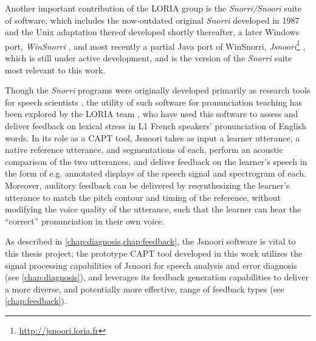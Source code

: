 	Another important contribution of the LORIA group is 
	the \textit{Snorri/Snoori} suite of software, 
	which includes the now-outdated original \textit{Snorri} developed in 1987 \citep{Fohr1989} and the Unix adaptation thereof developed shortly thereafter,
	a later Windows port, \textit{WinSnorri} \citep{Laprie1999},
	and most recently a partial Java port of WinSnorri, \textit{Jsnoori}\footnote{\url{http://jsnoori.loria.fr}} \citep{Parole2013}, which is still under active development, and is the version of the \textit{Snorri} suite most relevant to this work.
	
	
	Though the \textit{Snorri} programs were originally developed primarily as research tools for speech scientists %
	\citep{Fohr1989,Laprie1999}, 
	the utility of such software
	for pronunciation teaching has been explored by the LORIA team \citep{Bonneau2004,Henry2007,Bonneau2011},
	who have used 
	this software to assess and deliver feedback on lexical stress in L1 French speakers' pronunciation of English words. 
In its role as a CAPT tool, Jsnoori 
takes as input a learner utterance, a native reference utterance, and segmentations of each, perform an acoustic comparison of the two utterances, and deliver feedback on the learner's speech in the form of e.g. annotated displays of the speech signal and spectrogram of each. Moreover, auditory feedback can be delivered 
by
resynthesizing the learner's utterance to match the pitch contour and timing of the reference, without modifying the voice quality of the utterance, such that the learner can hear the ``correct'' pronunciation in their own voice. 
%
	
	
	

As described in \cref{chap:diagnosis,chap:feedback}, 
the Jsnoori software is vital to this thesis project;
the prototype CAPT tool developed in this work 
utilizes the signal processing capabilities of Jsnoori 
for speech analysis and error diagnosis (see \cref{chap:diagnosis}), 
and leverages its feedback generation capabilities to deliver  a more diverse, and potentially more effective, range of feedback types (see \cref{chap:feedback}). 
	
